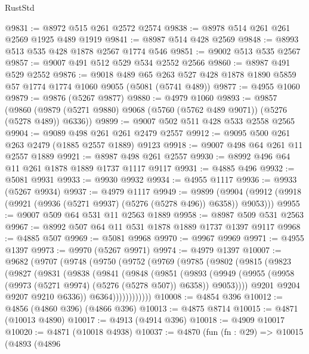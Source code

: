 \begin{lexlean}{RustStd}
\begin{coremodule}
@9831 := @8972 @515 @261 @2572 @2574
@9838 := @8978 @514 @261 @261 @2569 @1925 @489 @1919
@9841 := @8987 @514 @428 @2569
@9848 := @8993 @513 @535 @428 @1878 @2567 @1774 @546
@9851 := @9002 @513 @535 @2567
@9857 := @9007 @491 @512 @529 @534 @2552 @2566
@9860 := @8987 @491 @529 @2552
@9876 := @9018
    @489
    @65
    @263
    @527
    @428
    @1878
    @1890
    @5859
    @57
    @1774
    @1774
    @1060
    @9055
    (@5081 (@5741 @489))
@9877 := @4955 @1060
@9879 := @9876 (@5267 @9877)
@9880 := @4979 @1060
@9893 := @9857
    (@9860 (@9879 (@5271 @9880) @9068 (@5760 (@5762 @489 @9071)) (@5276 (@5278 @489)) @6336))
@9899 := @9007 @502 @511 @428 @533 @2558 @2565
@9904 := @9089 @498 @261 @261 @2479 @2557
@9912 := @9095 @500 @261 @263 @2479 (@1885 @2557 @1889) @9123
@9918 := @9007 @498 @64 @261 @11 @2557 @1889
@9921 := @8987 @498 @261 @2557
@9930 := @8992 @496 @64 @11 @261 @1878 @1889 @1737 @1117 @9117
@9931 := @4885 @496
@9932 := @5081 @9931
@9933 := @9930 @9932
@9934 := @4955 @1117
@9936 := @9933 (@5267 @9934)
@9937 := @4979 @1117
@9949 := @9899
    (@9904 (@9912 (@9918 (@9921 (@9936 (@5271 @9937) (@5276 (@5278 @496)) @6358)) @9053)))
@9955 := @9007 @509 @64 @531 @11 @2563 @1889
@9958 := @8987 @509 @531 @2563
@9967 := @8992 @507 @64 @11 @531 @1878 @1889 @1737 @1397 @9117
@9968 := @4885 @507
@9969 := @5081 @9968
@9970 := @9967 @9969
@9971 := @4955 @1397
@9973 := @9970 (@5267 @9971)
@9974 := @4979 @1397
@10007 := @9682
    (@9707
      (@9748
        (@9750
          (@9752
            (@9769
              (@9785
                (@9802
                  (@9815
                    (@9823
                      (@9827
                        (@9831
                          (@9838
                            (@9841
                              (@9848
                                (@9851
                                  (@9893
                                    (@9949
                                      (@9955
                                        (@9958 (@9973 (@5271 @9974) (@5276 (@5278 @507)) @6358))
                                        @9053))))
                                @9201
                                @9204
                                @9207
                                @9210
                                @6336))
                            @6364))))))))))))
@10008 := @4854 @396
@10012 := @4856 (@4860 @396) (@4866 @396)
@10013 := @4875 @8714
@10015 := @4871 (@10013 @4890)
@10017 := @4913 (@4914 @396)
@10018 := @4909 @10017
@10020 := @4871 (@10018 @4938)
@10037 := @4870
    (fun (fn : @29) =>
    @10015
      (@4893
        (@4896

\end{coremodule}
\end{lexlean}
